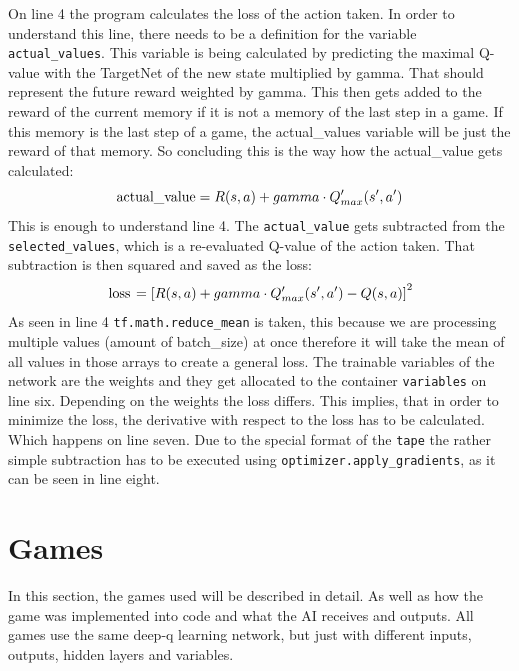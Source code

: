 \documentclass[12pt]{article}
\def\gamma{gamma}%
\begin{document}
On line 4 the program calculates the loss of the action taken. In order to understand this line, there needs to be a definition for the variable \lstinline{actual_values}. This variable is being calculated by predicting the maximal \gls{Q-value} with the \gls{TargetNet} of the new \gls{state} multiplied by \gls{gamma}. That should represent the future \gls{reward} weighted by \gls{gamma}. This then gets added to the \gls{reward} of the current \gls{memory} if it is not a \gls{memory} of the last step in a game. If this \gls{memory} is the last step of a game, the actual\_values variable will be just the \gls{reward} of that \gls{memory}. So concluding this is the way how the actual\_value gets calculated:
\begin{equation}\nonumber
\text{\lstinline{actual_value}} = R(s, a) + \gamma \cdot Q'_{max}(s', a')
\end{equation}
This is enough to understand line 4. The \lstinline{actual_value} gets subtracted from the \lstinline{selected_values}, which is a re-evaluated \gls{Q-value} of the action taken. That subtraction is then squared and saved as the loss: 
\begin{equation}\nonumber
    \text{\lstinline{loss}} = \left [ R(s, a) + \gamma \cdot Q_{max}'(s', a') - Q(s, a) \right ]^{2}
\end{equation}
As seen in line 4 \lstinline{tf.math.reduce_mean} is taken, this because we are processing multiple values (amount of batch\_size) at once therefore it will take the mean of all values in those arrays to create a general loss.
The trainable variables of the network are the \glspl{weight} and they get allocated to the container \lstinline{variables} on line six. Depending on the \glspl{weight} the loss differs. This implies, that in order to minimize the loss, the derivative with respect to the loss has to be calculated.  Which happens on line seven. Due to the special format of the \lstinline{tape} the rather simple subtraction has to be executed using \lstinline{optimizer.apply_gradients}, as it can be seen in line eight. \cite{tf.keras.optimizers}
\section{Games}\label{sec:Games}
In this section, the games used will be described in detail. As well as how the game was implemented into code and what the \gls{AI} receives and \glspl{output}. All games use the same deep-q learning network, but just with different  \glspl{input}, \glspl{output}, \glspl{hidden layer} and variables.
\end{document}
